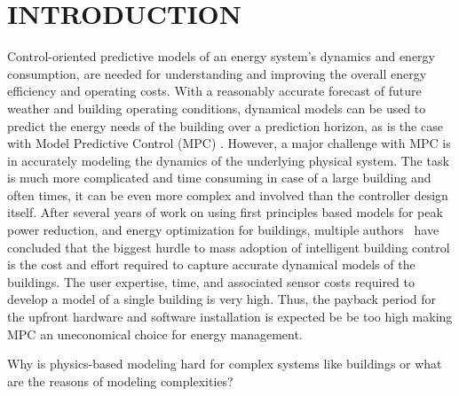 \section{INTRODUCTION}
\label{S:intro}

Control-oriented predictive models of an energy system's dynamics and energy consumption, are needed for understanding and improving the overall energy efficiency and operating costs. With a reasonably accurate forecast of future weather and building operating conditions, dynamical models can be used to predict the energy needs of the building over a prediction horizon, as is the case with Model Predictive Control (MPC) \cite{Sturzenegger2016}. However, a major challenge with MPC is in accurately modeling the dynamics of the underlying physical system.
The task is much more complicated and time consuming in case of a large building and often times, it can be even more complex and involved than the controller design itself.
After several years of work on using first principles based models for peak power reduction, and energy optimization for buildings, multiple authors~\cite{Sturzenegger2016, vzavcekova2014} have concluded that the biggest hurdle to mass adoption of intelligent building control is the cost and effort required to capture accurate dynamical models of the buildings.
The user expertise, time, and associated sensor costs required to develop a model of a single building is very high. Thus, the payback period for the upfront hardware and software installation is expected be be too high making MPC an uneconomical choice for energy management.

Why is physics-based modeling hard for complex systems like buildings or what are the reasons of modeling complexities?

